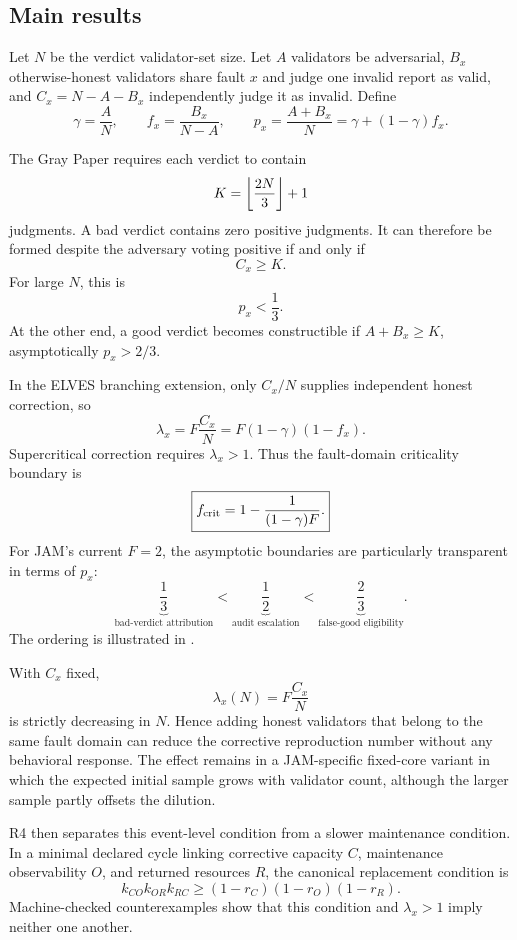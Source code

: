 \subsection{Main results}

Let \(N\) be the verdict validator-set size. Let \(A\) validators be adversarial, \(B_x\) otherwise-honest validators share fault \(x\) and judge one invalid report as valid, and \(C_x=N-A-B_x\) independently judge it as invalid. Define
\[
\gamma=\frac{A}{N},
\qquad
f_x=\frac{B_x}{N-A},
\qquad
p_x=\frac{A+B_x}{N}=\gamma+(1-\gamma)f_x.
\]

The Gray Paper requires each verdict to contain
\[
K=\left\lfloor \frac{2N}{3}\right\rfloor+1
\]
judgments. A bad verdict contains zero positive judgments. It can therefore be formed despite the adversary voting positive if and only if
\[
\boxed{C_x\ge K.}
\]
For large \(N\), this is
\[
\boxed{p_x<\frac13.}
\]
At the other end, a good verdict becomes constructible if \(A+B_x\ge K\), asymptotically \(p_x>2/3\).

In the ELVES branching extension, only \(C_x/N\) supplies independent honest correction, so
\[
\boxed{\lambda_x=F\frac{C_x}{N}=F(1-\gamma)(1-f_x).}
\]
Supercritical correction requires \(\lambda_x>1\). Thus the fault-domain criticality boundary is
\[
\boxed{
 f_{\rm crit}=1-\frac{1}{(1-\gamma)F}.
}
\]
For JAM's current \(F=2\), the asymptotic boundaries are particularly transparent in terms of \(p_x\):
\[
\boxed{
\underbrace{\frac13}_{\text{bad-verdict attribution}}
<
\underbrace{\frac12}_{\text{audit escalation}}
<
\underbrace{\frac23}_{\text{false-good eligibility}}.
}
\]
The ordering is illustrated in .

With \(C_x\) fixed,
\[
\lambda_x(N)=F\frac{C_x}{N}
\]
is strictly decreasing in \(N\). Hence adding honest validators that belong to the same fault domain can reduce the corrective reproduction number without any behavioral response. The effect remains in a JAM-specific fixed-core variant in which the expected initial sample grows with validator count, although the larger sample partly offsets the dilution.

R4 then separates this event-level condition from a slower maintenance condition. In a minimal declared cycle linking corrective capacity \(C\), maintenance observability \(O\), and returned resources \(R\), the canonical replacement condition is
\[
\boxed{
k_{CO}k_{OR}k_{RC}\ge(1-r_C)(1-r_O)(1-r_R).
}
\]
Machine-checked counterexamples show that this condition and \(\lambda_x>1\) imply neither one another.

